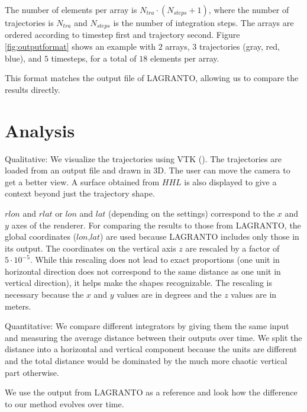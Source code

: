 The number of elements per array is $N_{tra}\cdot(N_{steps}+1)$, where the number of trajectories is $N_{tra}$ and $N_{steps}$ is the number of integration steps. The arrays are ordered according to timestep first and  trajectory second. Figure \ref{fig:outputformat} shows an example with $2$ arrays, $3$ trajectories (gray, red, blue), and $5$ timesteps, for a total of $18$ elements per array.

This format matches the output file of LAGRANTO, allowing us to compare the results directly.

\section{Analysis}

Qualitative:
We visualize the trajectories using VTK (\cite{src:vtk}). The trajectories are loaded from an output file and drawn in 3D. The user can move the camera to get a better view. A surface obtained from $HHL$ is also displayed to give a context beyond just the trajectory shape.

$rlon$ and $rlat$ or $lon$ and $lat$ (depending on the settings) correspond to the $x$ and $y$ axes of the renderer. For comparing the results to those from LAGRANTO, the global coordinates ($lon$,$lat$) are used because LAGRANTO includes only those in its output. The coordinates on the vertical axis $z$ are rescaled by a factor of  $5\cdot 10^{-5}$. While this rescaling does not lead to exact proportions (one unit in horizontal direction does not correspond to the same distance as one unit in vertical direction), it helps make the shapes recognizable. The rescaling is necessary because the $x$ and $y$ values are in degrees and the $z$ values are in meters.

Quantitative:
We compare different integrators by giving them the same input and measuring the average distance between their outputs over time. We split the distance into a horizontal and vertical component because the units are different and the total distance would be dominated by the much more chaotic vertical part otherwise.

We use the output from LAGRANTO as a reference and look how the difference to our method evolves over time.

